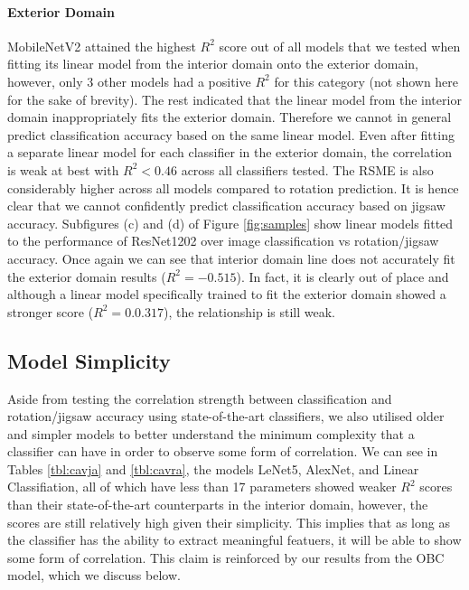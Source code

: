 \documentclass{article}
\begin{document}
\paragraph{Exterior Domain} MobileNetV2 attained the highest $R^2$ score out of all models that we tested when fitting its linear model from the interior domain onto the exterior domain, however, only 3 other models had a positive $R^2$ for this category (not shown here for the sake of brevity). The rest indicated that the linear model from the interior domain inappropriately fits the exterior domain. Therefore we cannot in general predict classification accuracy based on the same linear model. Even after fitting a separate linear model for each classifier in the exterior domain, the correlation is weak at best with $R^2 < 0.46$ across all classifiers tested. The RSME is also considerably higher across all models compared to rotation prediction. It is hence clear that we cannot confidently predict classification accuracy based on jigsaw accuracy. Subfigures (c) and (d) of Figure \ref{fig:samples} show linear models fitted to the performance of ResNet1202 over image classification vs rotation/jigsaw accuracy. Once again we can see that interior domain line does not accurately fit the exterior domain results ($R^2 = -0.515$). In fact, it is clearly out of place and although a linear model specifically trained to fit the exterior domain showed a stronger score ($R^2 = 0.0.317$), the relationship is still weak.

\subsection{Model Simplicity}
Aside from testing the correlation strength between classification and rotation/jigsaw accuracy using state-of-the-art classifiers, we also utilised older and simpler models to better understand the minimum complexity that a classifier can have in order to observe some form of correlation. We can see in Tables \ref{tbl:cavja} and \ref{tbl:cavra}, the models LeNet5, AlexNet, and Linear Classifiation, all of which have less than 17 parameters showed weaker $R^2$ scores than their state-of-the-art counterparts in the interior domain, however, the scores are still relatively high given their simplicity. This implies that as long as the classifier has the ability to extract meaningful featuers, it will be able to show some form of correlation. This claim is reinforced by our results from the OBC model, which we discuss below.
\end{document}
